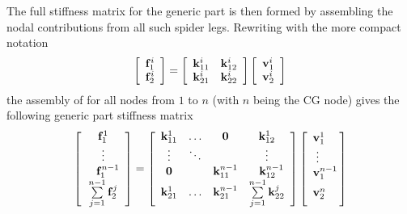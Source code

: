 The full stiffness matrix for the generic part is then formed by assembling the
nodal contributions from all such spider legs.
Rewriting  with the more compact notation
%
\begin{equation}
\left[\begin{array}{c}
{\bf f}^i_1 \\ {\bf f}^i_2
\end{array}\right] =
\left[\begin{array}{cc}
 {\bf k}^i_{11} &  {\bf k}^i_{12} \\
 {\bf k}^i_{21} &  {\bf k}^i_{22}
\end{array}\right]
\left[\begin{array}{c}
{\bf v}^i_1 \\ {\bf v}^i_2
\end{array}\right]
\end{equation}
%
the assembly of  for all nodes from $1$ to $n$
(with $n$ being the CG node) gives the following generic part stiffness matrix
%
\begin{equation}
\label{eq:generic part stiffness matrix}
\left[\begin{array}{c}
{\bf f}^1_1 \\ \vdots \\ \;\;\;{\bf f}^{n-1}_1 \\
\sum\limits_{j=1}^{n-1} {\bf f}^j_2
\end{array}\right] =
\left[\begin{array}{cccc}
{\bf k}^1_{11} & \hdots & {\bf 0}           & {\bf k}^1_{12} \\
\vdots         & \ddots &                   & \vdots         \\
{\bf 0}        &        & {\bf k}^{n-1}_{11} & \;\;\;{\bf k}^{n-1}_{12} \\
{\bf k}^1_{21} & \hdots & {\bf k}^{n-1}_{21} &
\sum\limits_{j=1}^{n-1} {\bf k}^j_{22}
\end{array}\right]
\left[\begin{array}{l}
{\bf v}^1_1 \\ \;\vdots \\ {\bf v}^{n-1}_1 \!\!\\[2mm] {\bf v}^n_2 \\[2mm]
\end{array}\right]
\end{equation}


